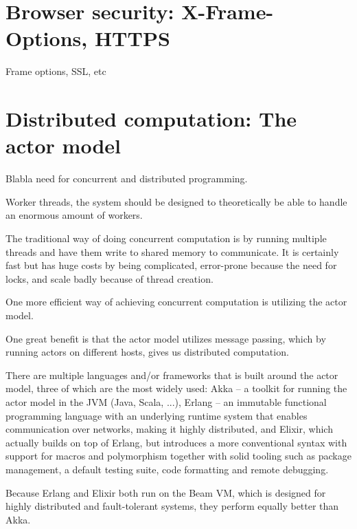 \section{Browser security: X-Frame-Options, HTTPS}

Frame options, SSL, etc

\section{Distributed computation: The actor model}


Blabla need for concurrent and distributed programming.

Worker threads, the system should be designed to theoretically be able to handle an enormous amount of workers.

The traditional way of doing concurrent computation is by running multiple threads and have them write to shared memory to communicate. It is certainly fast but has huge costs by being complicated, error-prone because the need for locks, and scale badly because of thread creation. %

One more efficient way of achieving concurrent computation is utilizing the actor model. %

One great benefit is that the actor model utilizes message passing, which by running actors on different hosts, gives us distributed computation.

There are multiple languages and/or frameworks that is built around the actor model, three of which are the most widely used: Akka -- a toolkit for running the actor model in the JVM (Java, Scala, ...), Erlang -- an immutable functional programming language with an underlying runtime system that enables communication over networks, making it highly distributed, and Elixir, which actually builds on top of Erlang, but introduces a more conventional syntax with support for macros and polymorphism together with solid tooling such as package management, a default testing suite, code formatting and remote debugging.



Because Erlang and Elixir both run on the Beam VM, which is designed for highly distributed and fault-tolerant systems, they perform equally better than Akka. %

